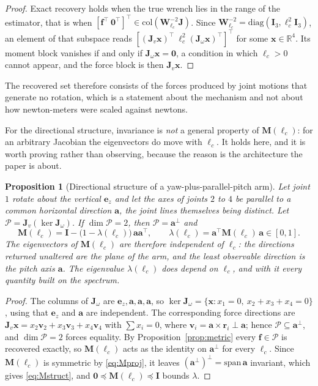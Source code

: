 \documentclass{ieeeaccess}
\newtheorem{proposition}{Proposition}
\newcommand{\R}{\mathbb{R}}
\newcommand{\Jv}{\bm{J}_{\!v}}
\newcommand{\Jw}{\bm{J}_{\!\omega}}
\newcommand{\Jfull}{\bm{J}}
\newcommand{\lc}{\ell_c}
\newcommand{\Wlc}{\bm{W}_{\!\lc}}
\newcommand{\Mlc}{\bm{M}(\lc)}
\begin{document}
\begin{proof}
Exact recovery holds when the true wrench lies in the range of the estimator,
that is when $[\bm f^{\!\top}\ \bm 0^{\!\top}]^{\!\top}\in\mathrm{col}
(\Wlc^{-2}\Jfull)$. Since $\Wlc^{-2}=\mathrm{diag}(\bm I_3,\lc^{2}\bm I_3)$, an
element of that subspace reads $[(\Jv\bm x)^{\!\top}\ \lc^{2}(\Jw\bm
x)^{\!\top}]^{\!\top}$ for some $\bm x\in\R^4$. Its moment block vanishes if and
only if $\Jw\bm x=\bm 0$, a condition in which $\lc>0$ cannot appear, and the
force block is then $\Jv\bm x$.
\end{proof}

The recovered set therefore consists of the forces produced by joint motions that
generate no rotation, which is a statement about the mechanism and not about how
newton-meters were scaled against newtons.

For the directional structure, invariance is \emph{not} a general property of
$\Mlc$: for an arbitrary Jacobian the eigenvectors do move with $\lc$. It holds
here, and it is worth proving rather than observing, because the reason is the
architecture the paper is about.

\begin{proposition}[Directional structure of a yaw-plus-parallel-pitch arm]
Let joint $1$ rotate about the vertical $\bm e_z$ and let the axes of joints $2$
to $4$ be parallel to a common horizontal direction $\bm a$, the joint lines
themselves being distinct. Let $\mathcal{P}=\Jv(\ker\Jw)$. If
$\dim\mathcal{P}=2$, then $\mathcal{P}=\bm a^{\perp}$ and
\begin{equation}
\Mlc=\bm I-\big(1-\lambda(\lc)\big)\,\bm a\bm a^{\!\top} ,
\qquad \lambda(\lc)=\bm a^{\!\top}\Mlc\,\bm a\in[0,1] .
\label{eq:Mstruct}
\end{equation}
The eigenvectors of $\Mlc$ are therefore independent of $\lc$: the directions
returned unaltered are the plane of the arm, and the least observable direction is
the pitch axis $\bm a$. The eigenvalue $\lambda(\lc)$ does depend on $\lc$, and
with it every quantity built on the spectrum.
\label{prop:arch}
\end{proposition}

\begin{proof}
The columns of $\Jw$ are $\bm e_z,\bm a,\bm a,\bm a$, so $\ker\Jw=\{\bm x:x_1=0,
\ x_2+x_3+x_4=0\}$, using that $\bm e_z$ and $\bm a$ are independent. The
corresponding force directions are $\Jv\bm x=x_2\bm v_2+x_3\bm v_3+x_4\bm v_4$
with $\sum x_i=0$, where $\bm v_i=\bm a\times\bm r_i\perp\bm a$; hence
$\mathcal{P}\subseteq\bm a^{\perp}$, and $\dim\mathcal{P}=2$ forces equality. By
Proposition~\ref{prop:metric} every $\bm f\in\mathcal{P}$ is recovered exactly, so
$\Mlc$ acts as the identity on $\bm a^{\perp}$ for every $\lc$. Since $\Mlc$ is
symmetric by \eqref{eq:Mproj}, it leaves $(\bm a^{\perp})^{\perp}=\mathrm{span}\,
\bm a$ invariant, which gives \eqref{eq:Mstruct}, and
$\bm 0\preceq\Mlc\preceq\bm I$ bounds $\lambda$.
\end{proof}
\end{document}
